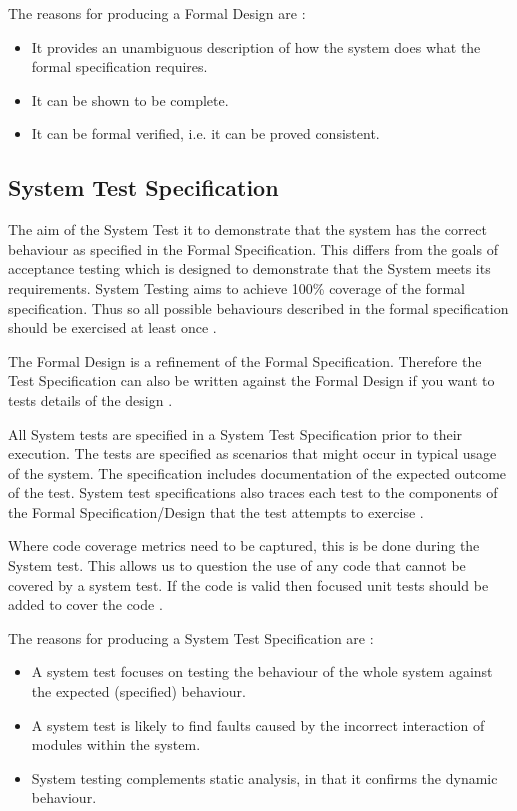 The reasons for producing a Formal Design are  \parencite{Tokeneer}:
\begin{itemize}
	\item It provides an unambiguous description of how the system does what the formal specification requires.
	\item It can be shown to be complete.
	\item It can be formal verified, i.e. it can be proved consistent.
\end{itemize}

\subsection{System Test Specification}

The aim of the System Test it to demonstrate that the system has the correct 
behaviour as specified in the Formal Specification. This differs from the goals of
acceptance testing which is designed to demonstrate that the System meets
its requirements. System Testing aims to achieve 100\% coverage of the formal 
specification. Thus so all possible behaviours described in the formal specification
should be exercised at least once \parencite{Tokeneer}.

The Formal Design is a refinement of the Formal Specification. Therefore the Test
Specification can also be written against the Formal Design if you want to tests 
details of the design \parencite{Tokeneer}.

All System tests are specified in a System Test Specification prior to their 
execution.  The tests are specified as scenarios that might occur in typical usage
of the system. The specification includes documentation of the expected outcome
of the test. System test specifications also traces each test to the components
of the Formal Specification/Design that the test attempts to exercise \parencite{Tokeneer}.

Where code coverage metrics need to be captured, this is be done during the
System test. This allows us to question the use of any code that cannot be covered
by a system test. If the code is valid then focused unit tests should be added to
cover the code \parencite{Tokeneer}.

The reasons for producing a System Test Specification are \parencite{Tokeneer}:
\begin{itemize}
	\item A system test focuses on testing the behaviour of the whole system against
		the expected (specified) behaviour.
	\item A system test is likely to find faults caused by the incorrect interaction
		of modules within the system.
	\item System testing complements static analysis, in that it confirms the 
		dynamic behaviour.
\end{itemize}

